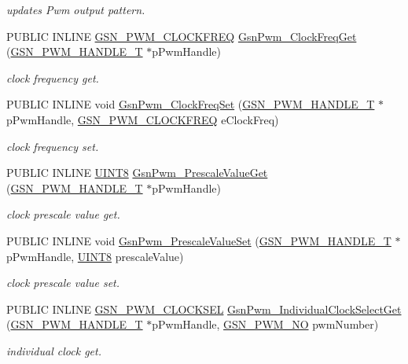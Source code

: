 \begin{DoxyCompactItemize}
\begin{DoxyCompactList}\small\item\em updates Pwm output pattern. \end{DoxyCompactList}\item 
PUBLIC INLINE \hyperlink{a00650_ga52371d0feb719879e34584cfa2ef6733}{GSN\_\-PWM\_\-CLOCKFREQ} \hyperlink{a00650_ga5a50ab57dd9fb26747a69f3e347a2680}{GsnPwm\_\-ClockFreqGet} (\hyperlink{a00182}{GSN\_\-PWM\_\-HANDLE\_\-T} $\ast$pPwmHandle)
\begin{DoxyCompactList}\small\item\em clock frequency get. \end{DoxyCompactList}\item 
PUBLIC INLINE void \hyperlink{a00650_ga86973f0fd8f4d941598f19d65b5b2da9}{GsnPwm\_\-ClockFreqSet} (\hyperlink{a00182}{GSN\_\-PWM\_\-HANDLE\_\-T} $\ast$pPwmHandle, \hyperlink{a00650_ga52371d0feb719879e34584cfa2ef6733}{GSN\_\-PWM\_\-CLOCKFREQ} eClockFreq)
\begin{DoxyCompactList}\small\item\em clock frequency set. \end{DoxyCompactList}\item 
PUBLIC INLINE \hyperlink{a00660_gab27e9918b538ce9d8ca692479b375b6a}{UINT8} \hyperlink{a00650_gaa6f74f03d046c5f1e95ad36065c9e538}{GsnPwm\_\-PrescaleValueGet} (\hyperlink{a00182}{GSN\_\-PWM\_\-HANDLE\_\-T} $\ast$pPwmHandle)
\begin{DoxyCompactList}\small\item\em clock prescale value get. \end{DoxyCompactList}\item 
PUBLIC INLINE void \hyperlink{a00650_gac52e516f0ba211226a2cdff62f54bdc8}{GsnPwm\_\-PrescaleValueSet} (\hyperlink{a00182}{GSN\_\-PWM\_\-HANDLE\_\-T} $\ast$pPwmHandle, \hyperlink{a00660_gab27e9918b538ce9d8ca692479b375b6a}{UINT8} prescaleValue)
\begin{DoxyCompactList}\small\item\em clock prescale value set. \end{DoxyCompactList}\item 
PUBLIC INLINE \hyperlink{a00650_gafda5110eb592af71b799ed22c7ebf902}{GSN\_\-PWM\_\-CLOCKSEL} \hyperlink{a00650_ga31992b0d90dbf78c04dd3aa695d41004}{GsnPwm\_\-IndividualClockSelectGet} (\hyperlink{a00182}{GSN\_\-PWM\_\-HANDLE\_\-T} $\ast$pPwmHandle, \hyperlink{a00650_ga9afe1c7d571460ff2f6780bef6b433df}{GSN\_\-PWM\_\-NO} pwmNumber)
\begin{DoxyCompactList}\small\item\em individual clock get. \end{DoxyCompactList}\item 

\end{DoxyCompactItemize}
